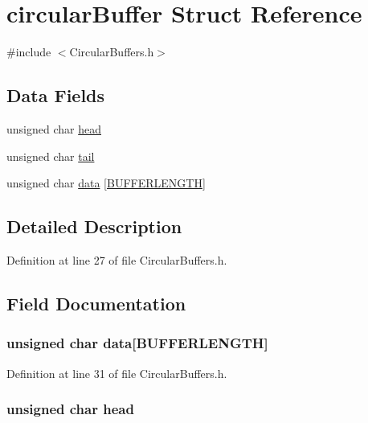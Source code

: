 \hypertarget{structcircular_buffer}{\section{circular\+Buffer Struct Reference}
\label{structcircular_buffer}
}


{\ttfamily \#include $<$Circular\+Buffers.\+h$>$}

\subsection*{Data Fields}
\begin{DoxyCompactItemize}
\item 
unsigned char \hyperlink{structcircular_buffer_a47f7e6109597e5c1c227993c0ce5f560}{head}
\item 
unsigned char \hyperlink{structcircular_buffer_af18a1d7542e277284c4794593b049258}{tail}
\item 
unsigned char \hyperlink{structcircular_buffer_ad7b57ba90694482456be1fbab7de4aec}{data} \mbox{[}\hyperlink{_circular_buffers_8h_a5a69f707d5405fe875b322c6bfbace46}{B\+U\+F\+F\+E\+R\+L\+E\+N\+G\+T\+H}\mbox{]}
\end{DoxyCompactItemize}


\subsection{Detailed Description}


Definition at line 27 of file Circular\+Buffers.\+h.



\subsection{Field Documentation}
\hypertarget{structcircular_buffer_ad7b57ba90694482456be1fbab7de4aec}{
\subsubsection[{data}]{\setlength{\rightskip}{0pt plus 5cm}unsigned char data\mbox{[}{\bf B\+U\+F\+F\+E\+R\+L\+E\+N\+G\+T\+H}\mbox{]}}}\label{structcircular_buffer_ad7b57ba90694482456be1fbab7de4aec}


Definition at line 31 of file Circular\+Buffers.\+h.

\hypertarget{structcircular_buffer_a47f7e6109597e5c1c227993c0ce5f560}{
\subsubsection[{head}]{\setlength{\rightskip}{0pt plus 5cm}unsigned char head}}\label{structcircular_buffer_a47f7e6109597e5c1c227993c0ce5f560}


